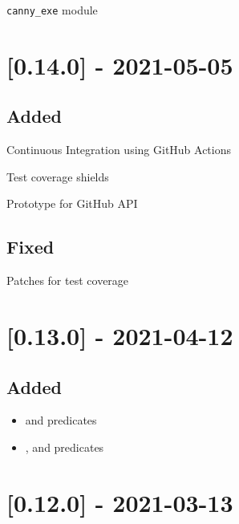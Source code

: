 \begin{shortlist}
    \item \verb$canny_exe$ module
\end{shortlist}

\section{[0.14.0] - 2021-05-05}

\subsection{Added}

\begin{shortlist}
    \item Continuous Integration using GitHub Actions
    \item Test coverage shields
    \item Prototype for GitHub API
\end{shortlist}

\subsection{Fixed}

\begin{shortlist}
    \item Patches for test coverage
\end{shortlist}

\section{[0.13.0] - 2021-04-12}

\subsection{Added}

\begin{itemize}
    \item {} and  predicates
    \item {},  and  predicates
\end{itemize}

\section{[0.12.0] - 2021-03-13}

